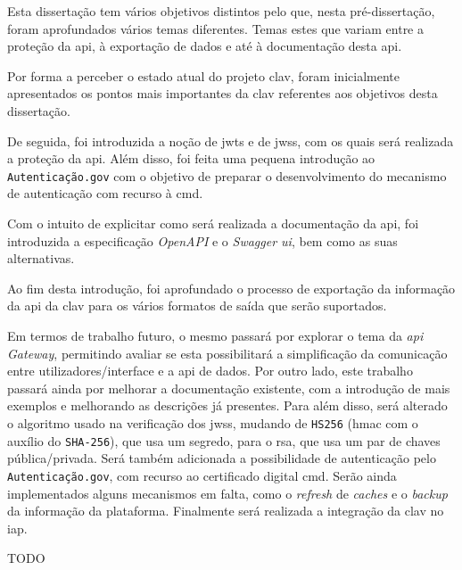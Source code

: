 
Esta dissertação tem vários objetivos distintos pelo que, nesta pré-dissertação, foram aprofundados vários temas diferentes. Temas estes que variam entre a proteção da \acrshort{api}, à exportação de dados e até à documentação desta \acrshort{api}.

Por forma a perceber o estado atual do projeto \acrshort{clav}, foram inicialmente apresentados os pontos mais importantes da \acrshort{clav} referentes aos objetivos desta dissertação.

De seguida, foi introduzida a noção de \acrshort{jwt}s e de \acrshort{jws}s, com os quais será realizada a proteção da \acrshort{api}. Além disso, foi feita uma pequena introdução ao \texttt{Autenticação.gov} com o objetivo de preparar o desenvolvimento do mecanismo de autenticação com recurso à \acrlong{cmd}.

Com o intuito de explicitar como será realizada a documentação da \acrshort{api}, foi introduzida a especificação \textit{OpenAPI} e o \textit{Swagger \acrshort{ui}}, bem como as suas alternativas.

Ao fim desta introdução, foi aprofundado o processo de exportação da informação da \acrshort{api} da \acrshort{clav} para os vários formatos de saída que serão suportados.

Em termos de trabalho futuro, o mesmo passará por explorar o tema da \textit{\acrshort{api} Gateway}, permitindo avaliar se esta possibilitará a simplificação da comunicação entre utilizadores/interface e a \acrshort{api} de dados. Por outro lado, este trabalho passará ainda por melhorar a documentação existente, com a introdução de mais exemplos e melhorando as descrições já presentes. Para além disso, será alterado o algoritmo usado na verificação dos \acrshort{jws}s, mudando de \texttt{HS256} (\acrshort{hmac} com o auxílio do \texttt{SHA-256}), que usa um segredo, para o \acrshort{rsa}, que usa um par de chaves pública/privada. Será também adicionada a possibilidade de autenticação pelo \texttt{Autenticação.gov}, com recurso ao certificado digital \acrlong{cmd}. Serão ainda implementados alguns mecanismos em falta, como o \textit{refresh} de \textit{caches} e o \textit{backup} da informação da plataforma. Finalmente será realizada a integração da \acrshort{clav} no \acrshort{iap}.

TODO
